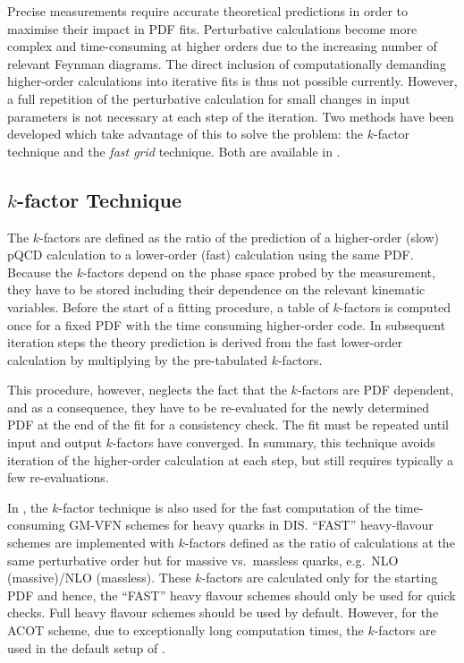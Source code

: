 
Precise measurements
require accurate theoretical predictions in
order to maximise their impact in PDF fits.  Perturbative
calculations become more complex and time-consuming at higher  
orders due to the increasing number of relevant Feynman diagrams.
The direct inclusion of computationally
demanding higher-order calculations into iterative fits is thus
not possible currently. However, a full repetition of the
perturbative calculation for small changes in input parameters is
not necessary at each step of the iteration.
Two methods have been developed which take advantage of this
to solve the problem: the $k$-factor technique and the
\emph{fast grid} technique. Both are available in \fitter.

\subsection{$k$-factor Technique}
  The $k$-factors are defined as the ratio of the prediction of a
  higher-order (slow) pQCD calculation to a lower-order (fast)
  calculation using the same PDF. Because the $k$-factors depend on the phase space
  probed by the measurement, they have to be stored  
including their dependence on
  the relevant kinematic variables. Before the start of  
  a fitting procedure, a table of $k$-factors is computed once
  for a fixed PDF with the time consuming higher-order code. In
  subsequent iteration steps the theory prediction is derived from the
  fast lower-order calculation by multiplying by the pre-tabulated
  $k$-factors.

  This procedure, however, neglects the fact that the $k$-factors are 
  PDF dependent, and 
  as a consequence, they have to be re-evaluated
  for the newly determined PDF at the end of the fit for a consistency
  check. The fit must be repeated until input and output
  $k$-factors have converged. In summary, this technique avoids
  iteration of the higher-order calculation at each step, but still
  requires typically a few re-evaluations.

In \fitter, the $k$-factor technique is also used for the fast 
computation of the time-consuming GM-VFN schemes for heavy quarks in DIS.
``FAST'' heavy-flavour schemes are implemented
with $k$-factors defined as the ratio of
calculations at the same perturbative order but for massive vs.\
massless quarks, e.g.\ NLO (massive)/NLO (massless).
These $k$-factors are calculated only for the
starting PDF and hence, the ``FAST'' heavy flavour schemes should
only be used for quick checks. Full heavy flavour schemes
should be used by default. However, for the ACOT scheme,
due to exceptionally long computation times, the $k$-factors are used in 
the default setup of \fitter. 

